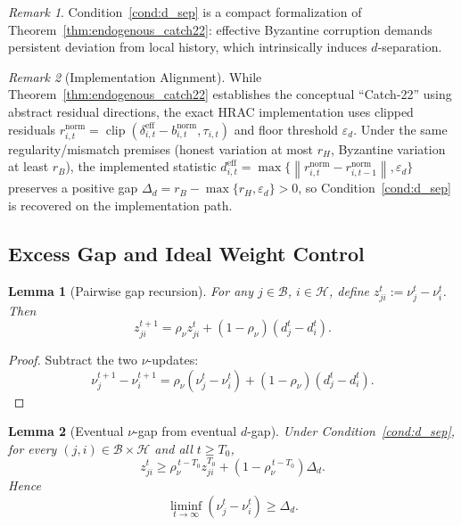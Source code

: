 \documentclass[11pt,a4paper]{article}
\newtheorem{lemma}{Lemma}
\theoremstyle{remark}
\newtheorem{remark}{Remark}
\newcommand{\HH}{\mathcal{H}}
\newcommand{\BB}{\mathcal{B}}
\newcommand{\clip}{\operatorname{clip}}
\newcommand{\norm}[1]{\left\lVert #1 \right\rVert}
\begin{document}
\begin{remark}
Condition~\ref{cond:d_sep} is a compact formalization of
Theorem~\ref{thm:endogenous_catch22}: effective Byzantine corruption demands
persistent deviation from local history, which intrinsically induces \(d\)-separation.
\end{remark}

\begin{remark}[Implementation Alignment]
\label{rem:implementation_alignment}
While Theorem~\ref{thm:endogenous_catch22} establishes the conceptual
``Catch-22'' using abstract residual directions, the exact HRAC implementation
uses clipped residuals
\(
r_{i,t}^{\mathrm{norm}}
=
\clip(\delta_{i,t}^{\mathrm{eff}}-b_{i,t}^{\mathrm{norm}}, \tau_{i,t})
\)
and floor threshold \(\varepsilon_d\). Under the same regularity/mismatch
premises (honest variation at most \(r_H\), Byzantine variation at least
\(r_B\)), the implemented statistic
\(
d_{i,t}^{\mathrm{eff}}
=
\max\{\norm{r_{i,t}^{\mathrm{norm}}-r_{i,t-1}^{\mathrm{norm}}}, \varepsilon_d\}
\)
preserves a positive gap
\(
\Delta_d = r_B-\max\{r_H,\varepsilon_d\}>0
\),
so Condition~\ref{cond:d_sep} is recovered on the implementation path.
\end{remark}

\subsection{Excess Gap and Ideal Weight Control}

\begin{lemma}[Pairwise gap recursion]
\label{lem:nu_gap_recursion}
For any \(j\in\BB\), \(i\in\HH\), define
\(z_{ji}^t:=\nu_j^t-\nu_i^t\). Then
\begin{equation}
    z_{ji}^{t+1}
    =
    \rho_\nu z_{ji}^t + (1-\rho_\nu)(d_j^t-d_i^t).
    \label{eq:z_recursion}
\end{equation}
\end{lemma}

\begin{proof}
Subtract the two \(\nu\)-updates:
\[
    \nu_j^{t+1}-\nu_i^{t+1}
    =
    \rho_\nu(\nu_j^t-\nu_i^t)+(1-\rho_\nu)(d_j^t-d_i^t).
\]
\end{proof}

\begin{lemma}[Eventual \(\nu\)-gap from eventual \(d\)-gap]
\label{lem:nu_gap_from_d_gap}
Under Condition~\ref{cond:d_sep}, for every \((j,i)\in\BB\times\HH\) and all
\(t\ge T_0\),
\begin{equation}
    z_{ji}^{t}
    \ge
    \rho_\nu^{\,t-T_0} z_{ji}^{T_0}
    +
    (1-\rho_\nu^{\,t-T_0})\Delta_d.
    \label{eq:z_lower}
\end{equation}
Hence
\begin{equation}
    \liminf_{t\to\infty}(\nu_j^t-\nu_i^t)\ge \Delta_d.
    \label{eq:nu_gap_liminf}
\end{equation}
\end{lemma}
\end{document}
